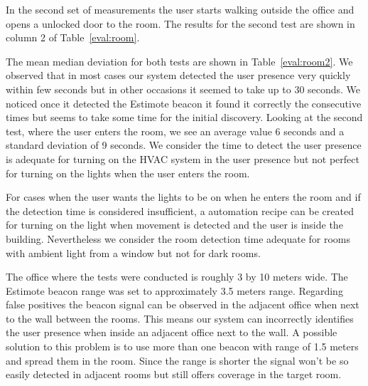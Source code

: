 In the second set of measurements the user starts walking outside the office and opens a unlocked door to the room. The results for the second test are shown in column 2 of Table~\ref{eval:room}.

The mean median deviation for both tests are shown in Table~\ref{eval:room2}. We observed that in most cases our system detected the user presence very quickly within few seconds but in other occasions it seemed to take up to 30 seconds. We noticed once it detected the Estimote beacon it found it correctly the consecutive times but seems to take some time for the initial discovery. Looking at the second test, where the user enters the room, we see an average value 6 seconds and a standard deviation of 9 seconds. We consider the time to detect the user presence is adequate for turning on the \ac{HVAC} system in the user presence but not perfect for turning on the lights when the user enters the room.

For cases when the user wants the lights to be on when he enters the room and if the detection time is considered insufficient, a automation recipe can be created for turning on the light when movement is detected and the user is inside the building. Nevertheless we consider the room detection time adequate for rooms with ambient light from a window but not for dark rooms.

The office where the tests were conducted is roughly 3 by 10 meters wide. The Estimote beacon range was set to approximately 3.5 meters range. Regarding false positives the beacon signal can be observed in the adjacent office when next to the wall between the rooms. This means our system can incorrectly identifies the user presence when inside an adjacent office next to the wall. A possible solution to this problem is to use more than one beacon with range of 1.5 meters and spread them in the room. Since the range is shorter the signal won't be so easily detected in adjacent rooms but still offers coverage in the target room.


